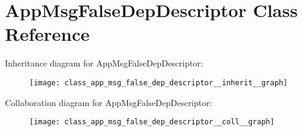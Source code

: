 \hypertarget{class_app_msg_false_dep_descriptor}{}\section{App\+Msg\+False\+Dep\+Descriptor Class Reference}
\label{class_app_msg_false_dep_descriptor}


Inheritance diagram for App\+Msg\+False\+Dep\+Descriptor\+:\nopagebreak
\begin{figure}[H]
\begin{center}
\leavevmode
\texttt{[image: class\_app\_msg\_false\_dep\_descriptor\_\_inherit\_\_graph]}
\end{center}
\end{figure}


Collaboration diagram for App\+Msg\+False\+Dep\+Descriptor\+:\nopagebreak
\begin{figure}[H]
\begin{center}
\leavevmode
\texttt{[image: class\_app\_msg\_false\_dep\_descriptor\_\_coll\_\_graph]}
\end{center}
\end{figure}
